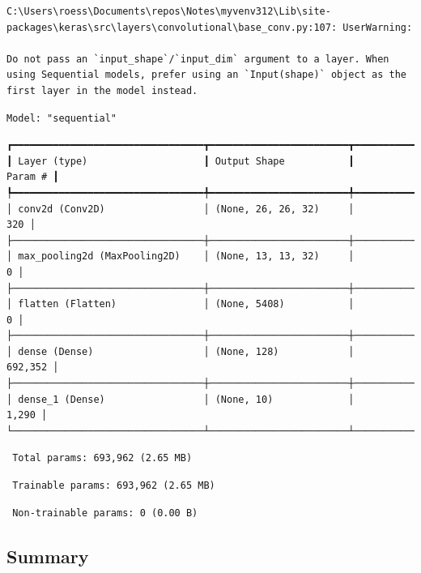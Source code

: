 \documentclass[
  letterpaper,
  DIV=11,
  numbers=noendperiod]{scrreprt}
\begin{document}
\begin{verbatim}
C:\Users\roess\Documents\repos\Notes\myvenv312\Lib\site-packages\keras\src\layers\convolutional\base_conv.py:107: UserWarning:

Do not pass an `input_shape`/`input_dim` argument to a layer. When using Sequential models, prefer using an `Input(shape)` object as the first layer in the model instead.
\end{verbatim}

\begin{verbatim}
Model: "sequential"
\end{verbatim}

\begin{verbatim}
┏━━━━━━━━━━━━━━━━━━━━━━━━━━━━━━━━━┳━━━━━━━━━━━━━━━━━━━━━━━━┳━━━━━━━━━━━━━━━┓
┃ Layer (type)                    ┃ Output Shape           ┃       Param # ┃
┡━━━━━━━━━━━━━━━━━━━━━━━━━━━━━━━━━╇━━━━━━━━━━━━━━━━━━━━━━━━╇━━━━━━━━━━━━━━━┩
│ conv2d (Conv2D)                 │ (None, 26, 26, 32)     │           320 │
├─────────────────────────────────┼────────────────────────┼───────────────┤
│ max_pooling2d (MaxPooling2D)    │ (None, 13, 13, 32)     │             0 │
├─────────────────────────────────┼────────────────────────┼───────────────┤
│ flatten (Flatten)               │ (None, 5408)           │             0 │
├─────────────────────────────────┼────────────────────────┼───────────────┤
│ dense (Dense)                   │ (None, 128)            │       692,352 │
├─────────────────────────────────┼────────────────────────┼───────────────┤
│ dense_1 (Dense)                 │ (None, 10)             │         1,290 │
└─────────────────────────────────┴────────────────────────┴───────────────┘
\end{verbatim}

\begin{verbatim}
 Total params: 693,962 (2.65 MB)
\end{verbatim}

\begin{verbatim}
 Trainable params: 693,962 (2.65 MB)
\end{verbatim}

\begin{verbatim}
 Non-trainable params: 0 (0.00 B)
\end{verbatim}

\subsection{Summary}\label{summary-1}
\end{document}
